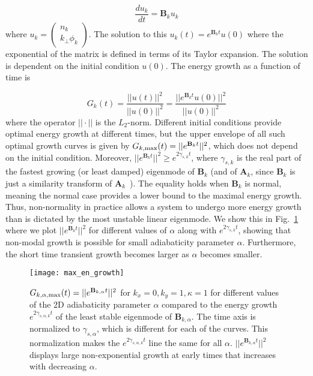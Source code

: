 \documentclass[letter,scriptaddress,twocolumn, prl,showkeys]{revtex4}
\def\beq{\begin{equation}}
\def\eeq{\end{equation}}
\newcommand{\diff}[2]{\frac{d#1}{d#2}}
\begin{document}
\beq
\label{lin_HW}
\diff{u_k}{t} = \mathbf{B}_k u_k
\eeq
where $u_k = \left( \begin{array}{cc} n_k \\ k_\perp \phi_k \end{array} \right)$. The solution to this $u_k(t) = e^{\mathbf{B}_k t} u(0)$ where the exponential of the matrix is defined in terms of
its Taylor expansion. The solution is dependent on the initial condition $u(0)$. The energy growth as a function of time is

\beq
\label{Gt}
G_k(t) = \frac{||u(t)||^2}{||u(0)||^2} = \frac{||e^{\mathbf{B}_k t} u(0)||^2}{||u(0)||^2}
\eeq
where the operator $|| \cdot ||$ is the $L_2$-norm. Different initial conditions provide optimal energy growth at different times, but the upper envelope of all such optimal growth curves is given by
$G_{k,\rm{max}}(t) = ||e^{\mathbf{B}_k t}||^2$, which does not depend on the initial condition.
Moreover, $||e^{\mathbf{B}_k t}||^2 \ge e^{2 \gamma_{s,k} t}$, where $\gamma_{s,k}$ is the real part of
the fastest growing (or least damped) eigenmode of $\mathbf{B}_k$ (and of $\mathbf{A}_k$, since $\mathbf{B}_k$ is just a similarity transform of $\mathbf{A}_k$~\cite{camargo1998}). 
The equality holds when $\mathbf{B}_k$ is normal, meaning the normal case provides a lower bound to the maximal energy growth. 
Thus, non-normality in practice allows a system to undergo more energy growth than is dictated by the most unstable linear eigenmode. We show this in Fig.~\ref{max_en_growth} where we plot
$||e^{\mathbf{B}_k t}||^2$ for different values of $\alpha$ along with $e^{2 \gamma_{s,k} t}$, showing that non-modal growth is possible for small adiabaticity parameter $\alpha$. Furthermore,
the short time transient growth becomes larger as $\alpha$ becomes smaller.

\begin{figure}
\centerline{\texttt{[image: max\_en\_growth]}}
\caption{$G_{k,\alpha,\rm{max}}(t) = ||e^{\mathbf{B}_{k,\alpha} t}||^2$ for $k_x=0, k_y=1, \kappa=1$ for different values of the 2D adiabaticity parameter 
$\alpha$ compared to the energy growth $e^{2 \gamma_{s,\alpha,k} t}$ of the least stable eigenmode of  $\mathbf{B}_{k,\alpha}$. 
The time axis is normalized to $\gamma_{s,\alpha}$, which is different for each of the curves. This normalization makes the $e^{2 \gamma_{s,\alpha,k} t}$ line the same for all $\alpha$. 
$||e^{\mathbf{B}_{k,\alpha} t}||^2$ displays large non-exponential growth at early times that increases with decreasing $\alpha$.}
\label{max_en_growth}
\end{figure}
\end{document}
